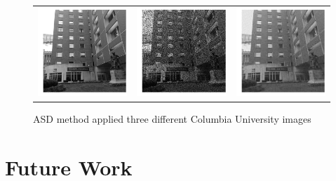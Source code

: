 \documentclass[12pt]{article}
\begin{document}
\begin{figure}[H]
{\begin{tabular}{ccc}
\includegraphics[width=65mm]{figures/columbia7.png}
&
\includegraphics[width=65mm]{figures/columbia8.png}
&
\includegraphics[width=65mm]{figures/columbia9.png}
\\
\end{tabular}

}

\caption{ASD method applied three different Columbia University images}
\end{figure}

\newpage



\section{Future Work}
\end{document}
